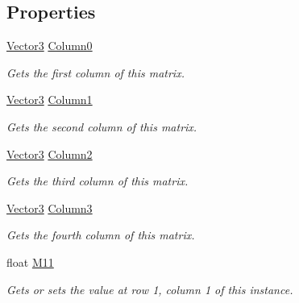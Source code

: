 \subsection*{Properties}
\begin{DoxyCompactItemize}
\item 
\hyperlink{struct_open_t_k_1_1_vector3}{Vector3} \hyperlink{struct_open_t_k_1_1_matrix3x4_abc877b3396743cb7733542d88028a746}{Column0}
\begin{DoxyCompactList}\small\item\em Gets the first column of this matrix. \end{DoxyCompactList}\item 
\hyperlink{struct_open_t_k_1_1_vector3}{Vector3} \hyperlink{struct_open_t_k_1_1_matrix3x4_acf69ea38e591f8ce8e9a6f79da1b16d5}{Column1}
\begin{DoxyCompactList}\small\item\em Gets the second column of this matrix. \end{DoxyCompactList}\item 
\hyperlink{struct_open_t_k_1_1_vector3}{Vector3} \hyperlink{struct_open_t_k_1_1_matrix3x4_ace806876886d620f84a9099bf4c138dd}{Column2}
\begin{DoxyCompactList}\small\item\em Gets the third column of this matrix. \end{DoxyCompactList}\item 
\hyperlink{struct_open_t_k_1_1_vector3}{Vector3} \hyperlink{struct_open_t_k_1_1_matrix3x4_acef43cea4db1af91adde3064372bdd64}{Column3}
\begin{DoxyCompactList}\small\item\em Gets the fourth column of this matrix. \end{DoxyCompactList}\item 
float \hyperlink{struct_open_t_k_1_1_matrix3x4_a3794b6741bc8614346f875f67b55c029}{M11}
\begin{DoxyCompactList}\small\item\em Gets or sets the value at row 1, column 1 of this instance. \end{DoxyCompactList}\item 

\end{DoxyCompactItemize}
